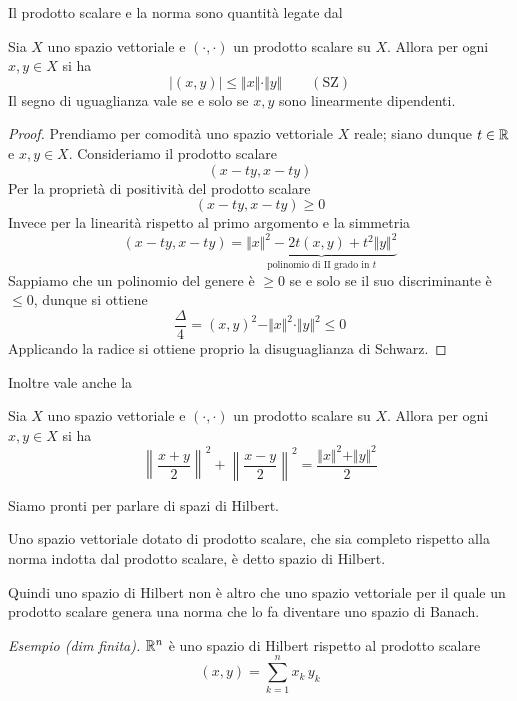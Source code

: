 Il prodotto scalare e la norma sono quantità legate dal
\begin{thm}[di Schwarz]
Sia $X$ uno spazio vettoriale e $(\cdot,\cdot)$ un prodotto scalare su $X$. Allora per ogni $x,y\in X$ si ha
\begin{equation*}
|(x,y)|\leq \Vert x\Vert \cdot \Vert y \Vert\qquad (\text{SZ})
\end{equation*}
Il segno di uguaglianza vale se e solo se $x,y$ sono linearmente dipendenti.
\end{thm}

\begin{proof}
Prendiamo per comodità uno spazio vettoriale $X$ reale; siano dunque $t\in\mathbb{R}$ e $x,y\in X$. Consideriamo il prodotto scalare
$$
(x-ty,x-ty)
$$
Per la proprietà di positività del prodotto scalare
$$
(x-ty,x-ty)\geq0
$$
Invece per la linearità rispetto al primo argomento e la simmetria
$$
(x-ty,x-ty)=\underbrace{\Vert x\Vert^2-2t(x,y)+t^2\Vert y\Vert^2}_{\text{polinomio di II grado in }t}
$$
Sappiamo che un polinomio del genere è $\geq 0$ se e solo se il suo discriminante è $\leq 0$, dunque si ottiene
$$
\frac{\Delta}{4}=(x,y)^2-\Vert x\Vert^2 \cdot \Vert y \Vert^2\leq 0
$$
Applicando la radice si ottiene proprio la disuguaglianza di Schwarz.
\end{proof}

Inoltre vale anche la
\begin{thm}
Sia $X$ uno spazio vettoriale e $(\cdot,\cdot)$ un prodotto scalare su $X$. Allora per ogni $x,y\in X$ si ha
\begin{equation*}
\left\|\frac{x+y}{2}\right\|^2+\left\|\frac{x-y}{2}\right\|^2=\frac{\Vert x\Vert^2 + \Vert y \Vert^2}{2}
\end{equation*}
\end{thm}

Siamo pronti per parlare di spazi di Hilbert.

\begin{defn}
Uno spazio vettoriale dotato di prodotto scalare, che sia completo rispetto alla norma indotta dal prodotto scalare, è detto spazio di Hilbert.
\end{defn}
Quindi uno spazio di Hilbert non è altro che uno spazio vettoriale per il quale un prodotto scalare genera una norma che lo fa diventare uno spazio di Banach.

\textit{Esempio (dim finita).} 
$\mathbb{R}^n$ è uno spazio di Hilbert rispetto al prodotto scalare
\begin{equation*}
(x,y)=\sum_{k=1}^n x_k\, y_k
\end{equation*}

